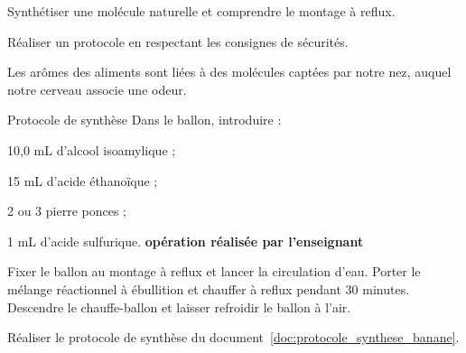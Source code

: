 \teteSndChim

\vspace*{-38pt}

\begin{objectifs}
  \item Synthétiser une molécule naturelle et comprendre le montage à reflux.
  \item Réaliser un protocole en respectant les consignes de sécurités.
\end{objectifs}

\begin{contexte}
  Les arômes des aliments sont liées à des molécules captées par notre nez, auquel notre cerveau associe une odeur.
  
\end{contexte}


\begin{doc}{Protocole de synthèse}
  \label{doc:protocole_synthese_banane}
  Dans le ballon, introduire :
  \begin{listePoints}
    \item 10,0 mL d'alcool isoamylique ;
    \item 15 mL d'acide éthanoïque ;
    \item 2 ou 3 pierre ponces ;
    \item 1 mL d'acide sulfurique. \attention \textbf{opération réalisée par l'enseignant} \attention
  \end{listePoints}
  
  Fixer le ballon au montage à reflux et lancer la circulation d'eau.
  Porter le mélange réactionnel à ébullition et chauffer à reflux pendant 30 minutes.
  Descendre le chauffe-ballon et laisser refroidir le ballon à l'air.
\end{doc}

\mesure Réaliser le protocole de synthèse du document~\ref{doc:protocole_synthese_banane}.


